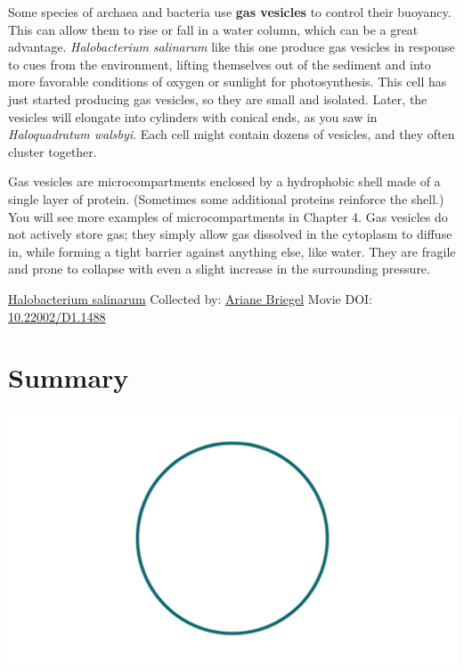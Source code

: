 \documentclass[]{tufte-book}
\begin{document}
Some species of archaea and bacteria use \textbf{gas vesicles} to control their buoyancy. This can allow them to rise or fall in a water column, which can be a great advantage. \emph{Halobacterium salinarum} like this one produce gas vesicles in response to cues from the environment, lifting themselves out of the sediment and into more favorable conditions of oxygen or sunlight for photosynthesis. This cell has just started producing gas vesicles, so they are small and isolated. Later, the vesicles will elongate into cylinders with conical ends, as you saw in \emph{Haloquadratum walsbyi}. Each cell might contain dozens of vesicles, and they often cluster together.

Gas vesicles are microcompartments enclosed by a hydrophobic shell made of a single layer of protein. (Sometimes some additional proteins reinforce the shell.) You will see more examples of microcompartments in Chapter 4. Gas vesicles do not actively store gas; they simply allow gas dissolved in the cytoplasm to diffuse in, while forming a tight barrier against anything else, like water. They are fragile and prone to collapse with even a slight increase in the surrounding pressure.



\hypertarget{htmlwidget-5be59df1148c6243ea4e}{}

\label{fig:3-7a}\protect\hyperlink{tree}{Halobacterium salinarum} Collected by: \protect\hyperlink{ariane_briegel}{Ariane Briegel} Movie DOI: \href{https://doi.org/10.22002/D1.1488}{10.22002/D1.1488}

\hypertarget{summary-2}{%
\section{Summary}\label{summary-2}}

\includegraphics{img/summaries/03_Shape}
\end{document}
